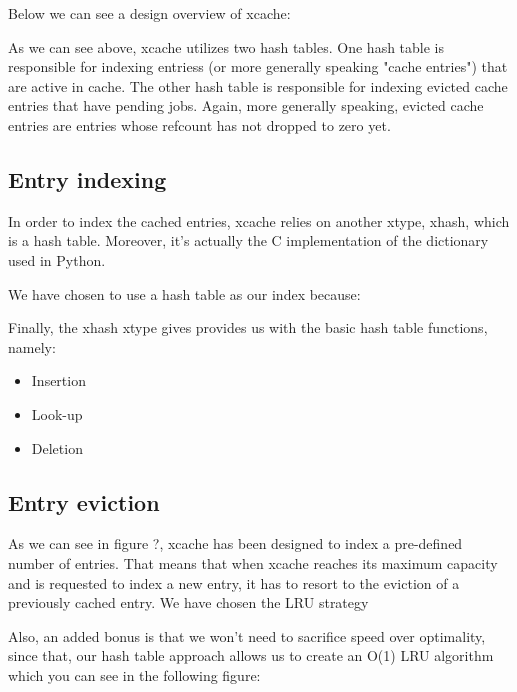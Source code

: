 Below we can see a design overview of xcache:


As we can see above, xcache utilizes two hash tables. One hash table is 
responsible for indexing entriess (or more generally speaking "cache entries") 
that are active in cache.  The other hash table is responsible for indexing 
evicted cache entries that have pending jobs.  Again, more generally speaking, 
evicted cache entries are entries whose refcount has not dropped to zero yet.

\subsection{Entry indexing}

In order to index the cached entries, xcache relies on another xtype, xhash, 
which is a hash table. Moreover, it's actually the C implementation of the 
dictionary used in Python.

We have chosen to use a hash table as our index because:

Finally, the xhash xtype gives provides us with the basic hash table functions, 
namely:

\begin{itemize}
	\item Insertion
	\item Look-up
	\item Deletion
\end{itemize}

\subsection{Entry eviction}

As we can see in figure ?, xcache has been designed to index a pre-defined 
number of entries. That means that when xcache reaches its maximum capacity and 
is requested to index a new entry, it has to resort to the eviction of a 
previously cached entry. We have chosen the LRU strategy 

Also, an added bonus is that we won't need to sacrifice speed over optimality, 
since that, our hash table approach allows us to create an O(1) LRU algorithm 
which you can see in the following figure:

